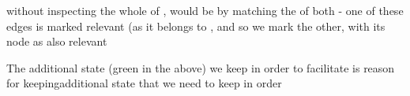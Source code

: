 



without inspecting the whole of , would be by matching the  of both  - one of these edges is marked relevant (as it belongs to , and so we mark the other, with its node  as also relevant 

The additional state (green in the above) we keep in order to facilitate is reason for keepingadditional state that we need to keep in order 

